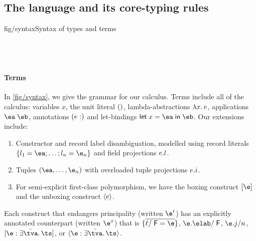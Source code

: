 \documentclass[acmsmall,screen,nonacm]{acmart}
\begin{document}
\subsection{The language and its core-\ML typing rules}

\begin{bnffig}{fig/syntax}{Syntax of types and terms}
\\[1ex]
\\
\\
\\
\end{bnffig}

\paragraph{Terms}

In \cref {fig/syntax}, we give the grammar for our calculus. Terms include
all of the \ML calculus: variables $x$, the unit literal $()$,
lambda-abstractions $\lambda x. \, e$, applications $\eapp \eone \etwo$,
annotations $(e
: \relax)$ and let-bindings $\elet x \eone \etwo$. Our extensions include:
\begin{enumerate}
\item
  Constructor and record label disambiguation, modelled using record
  literals $\erecord { \labone = \eone; \ldots; \labn = \en }$ and field
  projections $e.l$.

\item
  Tuples $(\eone, \ldots, \en)$ with overloaded tuple projections
  $e.i$.

\item
  For semi-explicit first-class polymorphism, we have the boxing construct
  $\epoly \e$  and the unboxing construct $\einst e$.

\end{enumerate}
Each construct that endangers principality (written $\e^i$) has an
explicitly annotated counterpart (written $\e^x$) that is $\erecord
{\overline{\ell / \F = \e}}$, $\eproj [\F] \e \elab$, $\eproj [n] \e j$,
$\epoly [\exi \tvs \ts] \e$, or $\einst [\exi
\tvs \ts] \e$.
\end{document}
